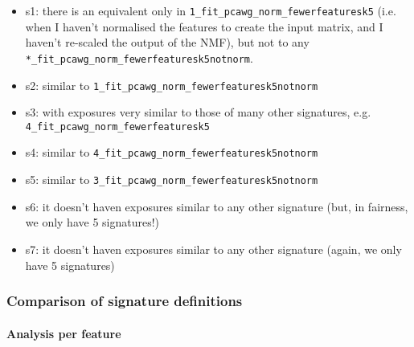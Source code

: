 \documentclass[11pt,a4paper,roman]{article}
\begin{document}
\begin{itemize}
\item s1: there is an equivalent only in \verb|1_fit_pcawg_norm_fewerfeaturesk5| (i.e. when I haven't normalised the features to create the input matrix, and I haven't re-scaled the output of the NMF), but not to any \verb|*_fit_pcawg_norm_fewerfeaturesk5notnorm|.
\item s2: similar to \verb|1_fit_pcawg_norm_fewerfeaturesk5notnorm|
\item s3: with exposures very similar to those of many other signatures, e.g.\\ \verb|4_fit_pcawg_norm_fewerfeaturesk5|
\item s4: similar to \verb|4_fit_pcawg_norm_fewerfeaturesk5notnorm|
\item s5: similar to \verb|3_fit_pcawg_norm_fewerfeaturesk5notnorm|
\item s6: it doesn't haven exposures similar to any other signature (but, in fairness, we only have 5 signatures!)
\item s7: it doesn't haven exposures similar to any other signature (again, we only have 5 signatures)
\end{itemize}


\subsubsection{Comparison of signature definitions}

\paragraph{Analysis per feature}
\end{document}
